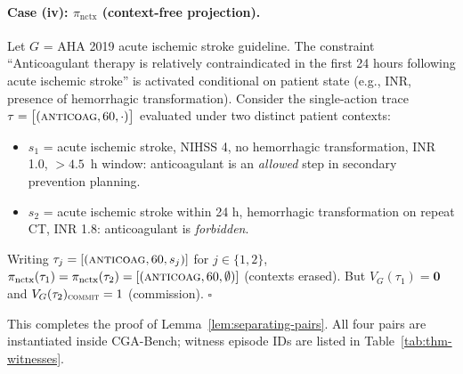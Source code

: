 \paragraph{Case (iv): $\pi_{\mathrm{nctx}}$ (context-free projection).}
Let $G$ = AHA 2019 acute ischemic stroke guideline. The constraint
``Anticoagulant therapy is relatively contraindicated in the first 24
hours following acute ischemic stroke'' is activated conditional on
patient state (e.g., INR, presence of hemorrhagic transformation).
Consider the single-action trace
$\tau = \bigl[(\textsc{anticoag},60,\cdot)\bigr]$ evaluated under two
distinct patient contexts:
\begin{itemize}[nosep,leftmargin=1.2em]
\item $s_1$ = acute ischemic stroke, NIHSS 4, no hemorrhagic
  transformation, INR 1.0, $>4.5$~h window: anticoagulant
  is an \emph{allowed} step in secondary prevention planning.
\item $s_2$ = acute ischemic stroke within 24 h, hemorrhagic
  transformation on repeat CT, INR 1.8: anticoagulant is
  \emph{forbidden}.
\end{itemize}
Writing $\tau_j=[(\textsc{anticoag},60,s_j)]$ for $j\in\{1,2\}$,
$\pi_{\mathrm{nctx}}(\tau_1)=\pi_{\mathrm{nctx}}(\tau_2)
=[(\textsc{anticoag},60,\emptyset)]$
(contexts erased). But $V_G(\tau_1)=\mathbf{0}$ and
$V_G(\tau_2)_{\textsc{commit}}=1$ (commission). \hfill $\square$

This completes the proof of Lemma~\ref{lem:separating-pairs}. All four
pairs are instantiated inside CGA-Bench; witness episode IDs are
listed in Table~\ref{tab:thm-witnesses}.

